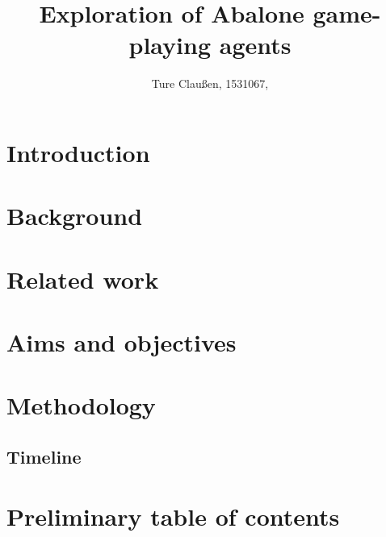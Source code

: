 \documentclass{../lib/llncs}
\begin{document}
\title{Exploration of Abalone game-playing agents}
\author{Ture Claußen, 1531067, }

{\def\addcontentsline#1#2#3{}\maketitle} %

\begin{abstract}
\end{abstract}


\section{Introduction}

\section{Background}

\section{Related work}

\section{Aims and objectives}

\section{Methodology}

\subsection{Timeline}

\section{Preliminary table of contents}



\end{document}

